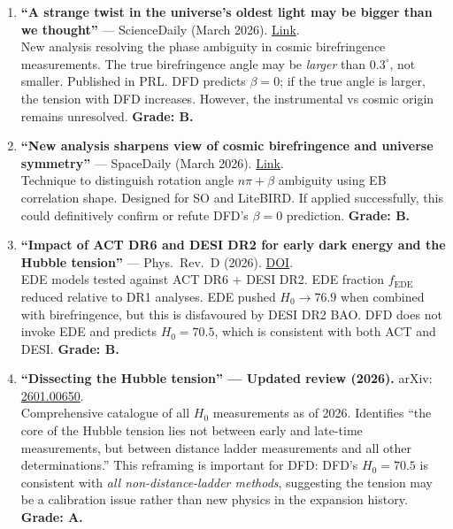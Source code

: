 \documentclass[11pt,a4paper]{article}
\begin{document}
\begin{enumerate}
\item \textbf{``A strange twist in the universe's oldest light may be bigger than we thought''} --- ScienceDaily (March 2026). \href{https://www.sciencedaily.com/releases/2026/03/260315225141.htm}{Link}.\\
New analysis resolving the phase ambiguity in cosmic birefringence measurements. The true birefringence angle may be \emph{larger} than $0.3^\circ$, not smaller. Published in PRL. DFD predicts $\beta = 0$; if the true angle is larger, the tension with DFD increases. However, the instrumental vs cosmic origin remains unresolved. \textbf{Grade: B.}

\item \textbf{``New analysis sharpens view of cosmic birefringence and universe symmetry''} --- SpaceDaily (March 2026). \href{https://www.spacedaily.com/reports/New_analysis_sharpens_view_of_cosmic_birefringence_and_universe_symmetry_999.html}{Link}.\\
Technique to distinguish rotation angle $n\pi + \beta$ ambiguity using EB correlation shape. Designed for SO and LiteBIRD. If applied successfully, this could definitively confirm or refute DFD's $\beta = 0$ prediction. \textbf{Grade: B.}

\item \textbf{``Impact of ACT DR6 and DESI DR2 for early dark energy and the Hubble tension''} --- Phys.\ Rev.\ D (2026). \href{https://journals.aps.org/prd/abstract/10.1103/bx25-1g5d}{DOI}.\\
EDE models tested against ACT DR6 + DESI DR2. EDE fraction $f_\mathrm{EDE}$ reduced relative to DR1 analyses. EDE pushed $H_0 \to 76.9$ when combined with birefringence, but this is disfavoured by DESI DR2 BAO. DFD does not invoke EDE and predicts $H_0 = 70.5$, which is consistent with both ACT and DESI. \textbf{Grade: B.}

\item \textbf{``Dissecting the Hubble tension'' --- Updated review (2026).} arXiv: \href{https://arxiv.org/abs/2601.00650}{2601.00650}.\\
Comprehensive catalogue of all $H_0$ measurements as of 2026. Identifies ``the core of the Hubble tension lies not between early and late-time measurements, but between distance ladder measurements and all other determinations.'' This reframing is important for DFD: DFD's $H_0 = 70.5$ is consistent with \emph{all non-distance-ladder methods}, suggesting the tension may be a calibration issue rather than new physics in the expansion history. \textbf{Grade: A.}
\end{enumerate}
\end{document}
